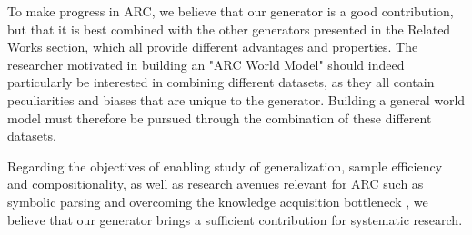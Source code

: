 To make progress in ARC, we believe that our generator is a good contribution, but that it is best combined with the other generators presented in the Related Works section, which all provide different advantages and properties. The researcher motivated in building an "ARC World Model" should indeed particularly be interested in combining different datasets, as they all contain peculiarities and biases that are unique to the generator. Building a general world model must therefore be pursued through the combination of these different datasets. 

Regarding the objectives of enabling study of generalization, sample efficiency and compositionality, as well as research avenues relevant for ARC such as symbolic parsing and overcoming the knowledge acquisition bottleneck \cite{symbolicAISOTA}, we believe that our generator brings a sufficient contribution for systematic research. 